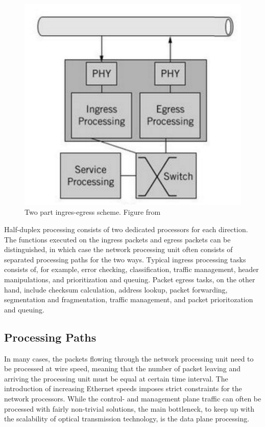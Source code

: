 \begin{figure}[]
  \begin{center}
    \includegraphics[width=.6\textwidth]{images/ingress-egress.pdf}
    \caption{Two part ingres-egress scheme. Figure from~\cite{Giladi:2008:Network}}
    \label{fig:ingress-egress}
  \end{center}
\end{figure}

Half-duplex processing consists of two dedicated processors for each direction. The functions executed on the ingress packets and egress packets can be distinguished, in which case the network processing unit often consists of separated processing paths for the two ways. Typical ingress processing tasks consists of, for example, error checking, classification, traffic management, header manipulations, and prioritization and queuing. Packet egress tasks, on the other hand, include checksum calculation, address lookup, packet forwarding, segmentation and fragmentation, traffic management, and packet prioritozation and queuing.~\cite{Giladi:2008:Network}

\subsection{Processing Paths}
In many cases, the packets flowing through the network processing unit need to be processed at wire speed, meaning that the number of packet leaving and arriving the processing unit must be equal at certain time interval. The introduction of increasing Ethernet speeds imposes strict constraints for the network processors. While the control- and management plane traffic can often be processed with fairly non-trivial solutions, the main bottleneck, to keep up with the scalability of optical transmission technology, is the data plane processing.~\cite{Giladi:2008:Network}

